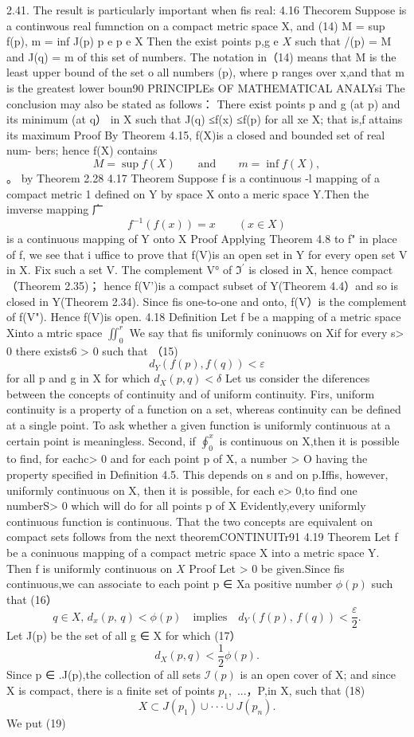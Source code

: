 2.41. The result is particularly important when fis real: 4.16 Thecorem Suppose is a continwous real fumnction on a compact metric space X, and (14) M = sup f(p), m = inf J(p) p e p e X Then the exist points p,g e $X$ such that /(p) = M and J(q) = m of this set of numbers. The notation in（14) means that M is the least upper bound of the set o all numbers (p), where p ranges over x,and that m is the greatest lower boun90 PRINCIPLEs OF MATHEMATICAL ANALYsi The conclusion may also be stated as follows： There exist points p and g (at p) and its minimum (at q） in X such that J(q) ≤f(x) ≤f(p) for all xe X; that is,f attains its maximum Proof By Theorem 4.15, f(X)is a closed and bounded set of real num- bers; hence f(X) contains $$ M=\operatorname*{sup}f(X)\qquad{\mathrm{and}}\qquad m=\operatorname*{inf}f(X), $$ 。 by Theorem 2.28 4.17 Theorem Suppose f is a continuous -l mapping of a compact metric 1 defined on Y by space X onto a meric space Y.Then the imverse mapping 广 $$ f^{-1}(f(x))=x\qquad(x\in X) $$ is a continuous mapping of Y onto X Proof Applying Theorem 4.8 to f" in place of f, we see that i uffice to prove that f(V)is an open set in Y for every open set V in X. Fix such a set V. The complement V° of ${\mathfrak{I}}^{\prime}$ is closed in X, hence compact （Theorem 2.35)； hence f(V')is a compact subset of Y(Theorem 4.4）and so is closed in Y(Theorem 2.34). Since fis one-to-one and onto, f(V）is the complement of f(V"). Hence f(V)is open. 4.18 Definition Let f be a mapping of a metric space Xinto a mtric space $\textstyle\iint_{0}^{r}$ We say that fis uniformly coninuows on Xif for every s> 0 there exists6 > 0 such that （15) $$ d_{Y}(f(p),f(q))<\varepsilon $$ for all p and g in X for which $d_{X}(p,q)<\delta$ Let us consider the diferences between the concepts of continuity and of uniform continuity. Firs, uniform continuity is a property of a function on a set, whereas continuity can be defined at a single point. To ask whether a given function is uniformly continuous at a certain point is meaningless. Second, if $\oint_{0}^{x}$ is continuous on X,then it is possible to find, for eachc> 0 and for each point p of X, a number > O having the property specified in Definition 4.5. This depends on s and on p.Iffis, however, uniformly continuous on X, then it is possible, for each e> 0,to find one numberS> 0 which will do for all points p of X Evidently,every uniformly continuous function is continuous. That the two concepts are equivalent on compact sets follows from the next theoremCONTINUITr91 4.19 Theorem Let f be a coninuous mapping of a compact metric space X into a metric space Y. Then f is uniformly continuous on $X$ Proof Let > 0 be given.Since fis continuous,we can associate to each point p ∈ Xa positive number $\phi(p)$ such that (16） $$ q\in X,\,d_{x}(p,\,q)<\phi(p)\quad{\mathrm{implies}}\quad d_{Y}(f(p),\,f(q))<{\frac{\varepsilon}{2}}. $$ Let J(p) be the set of all g ∈ X for which (17） $$ d_{X}(p,q)<{\frac{1}{2}}\phi(p). $$ Since p ∈ .J(p),the collection of all sets ${\mathcal{I}}(p)$ is an open cover of X; and since X is compact, there is a finite set of points $p_{1},$ ...，P,in X, such that (18) $$ X\subset J(p_{1})\cup\cdot\cdot\cdot\cup J(p_{n}). $$ We put (19) $$ 